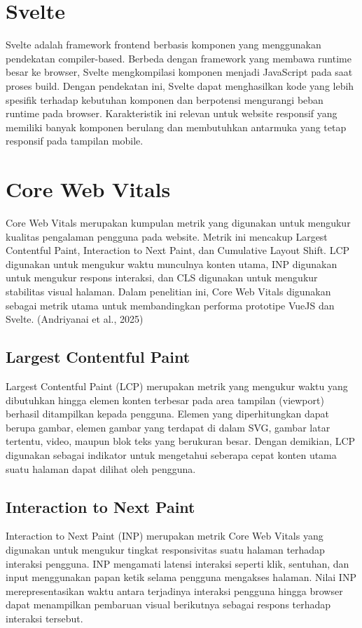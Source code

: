 \documentclass[12pt,a4paper]{report}
\begin{document}
\section{Svelte}
Svelte adalah framework frontend berbasis komponen yang menggunakan pendekatan compiler-based. Berbeda dengan framework yang membawa runtime besar ke browser, Svelte mengkompilasi komponen menjadi JavaScript pada saat proses build. Dengan pendekatan ini, Svelte dapat menghasilkan kode yang lebih spesifik terhadap kebutuhan komponen dan berpotensi mengurangi beban runtime pada browser. Karakteristik ini relevan untuk website responsif yang memiliki banyak komponen berulang dan membutuhkan antarmuka yang tetap responsif pada tampilan mobile.

\section{Core Web Vitals}
Core Web Vitals merupakan kumpulan metrik yang digunakan untuk mengukur kualitas pengalaman pengguna pada website. Metrik ini mencakup Largest Contentful Paint, Interaction to Next Paint, dan Cumulative Layout Shift. LCP digunakan untuk mengukur waktu munculnya konten utama, INP digunakan untuk mengukur respons interaksi, dan CLS digunakan untuk mengukur stabilitas visual halaman. Dalam penelitian ini, Core Web Vitals digunakan sebagai metrik utama untuk membandingkan performa prototipe VueJS dan Svelte. (Andriyanai et al., 2025)

\subsection{Largest Contentful Paint}
Largest Contentful Paint (LCP) merupakan metrik yang mengukur waktu yang dibutuhkan hingga elemen konten terbesar pada area tampilan (viewport) berhasil ditampilkan kepada pengguna. Elemen yang diperhitungkan dapat berupa gambar, elemen gambar yang terdapat di dalam SVG, gambar latar tertentu, video, maupun blok teks yang berukuran besar. Dengan demikian, LCP digunakan sebagai indikator untuk mengetahui seberapa cepat konten utama suatu halaman dapat dilihat oleh pengguna.

\subsection{Interaction to Next Paint}
Interaction to Next Paint (INP) merupakan metrik Core Web Vitals yang digunakan untuk mengukur tingkat responsivitas suatu halaman terhadap interaksi pengguna. INP mengamati latensi interaksi seperti klik, sentuhan, dan input menggunakan papan ketik selama pengguna mengakses halaman. Nilai INP merepresentasikan waktu antara terjadinya interaksi pengguna hingga browser dapat menampilkan pembaruan visual berikutnya sebagai respons terhadap interaksi tersebut.
\end{document}
